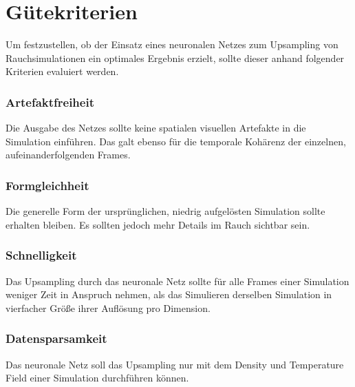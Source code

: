 \section{Gütekriterien}
Um festzustellen, ob der Einsatz eines neuronalen Netzes zum Upsampling von Rauchsimulationen ein optimales Ergebnis erzielt, sollte dieser anhand folgender Kriterien evaluiert werden.\\

\subsubsection*{Artefaktfreiheit} Die Ausgabe des Netzes sollte keine spatialen visuellen Artefakte in die Simulation einführen. Das galt ebenso für die temporale Kohärenz der einzelnen, aufeinanderfolgenden Frames.\\

\subsubsection*{Formgleichheit} Die generelle Form der ursprünglichen, niedrig aufgelösten Simulation sollte erhalten bleiben. Es sollten jedoch mehr Details im Rauch sichtbar sein.\\

\subsubsection*{Schnelligkeit} Das Upsampling durch das neuronale Netz sollte für alle Frames einer Simulation weniger Zeit in Anspruch nehmen, als das Simulieren derselben Simulation in vierfacher Größe ihrer Auflösung pro Dimension. \\

\subsubsection*{Datensparsamkeit} Das neuronale Netz soll das Upsampling nur mit dem Density und Temperature Field einer Simulation durchführen können.\\

